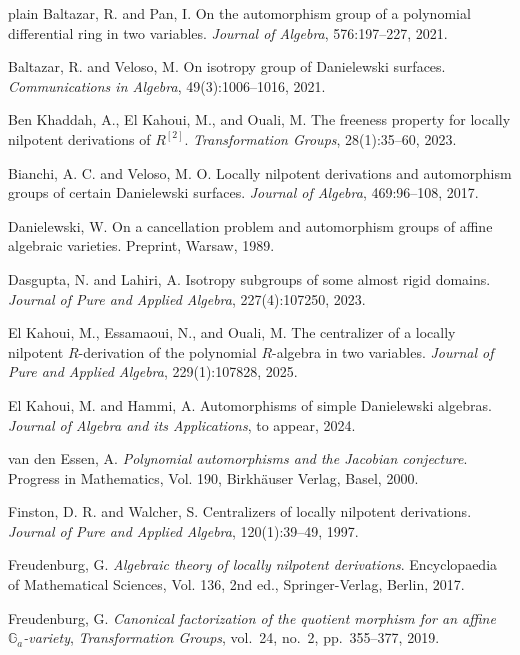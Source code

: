 \documentclass{article}
\begin{document}
{\begin{thebibliography}{plain}
Baltazar, R. and Pan, I. On the automorphism group of a polynomial differential ring in two variables. \textit{Journal of Algebra}, 576:197--227, 2021.

Baltazar, R. and Veloso, M. On isotropy group of Danielewski surfaces. \textit{Communications in Algebra}, 49(3):1006--1016, 2021.

Ben Khaddah, A., El Kahoui, M., and Ouali, M. The freeness property for locally nilpotent derivations of $R^{[2]}$. \textit{Transformation Groups}, 28(1):35--60, 2023.

Bianchi, A. C. and Veloso, M. O. Locally nilpotent derivations and automorphism groups of certain Danielewski surfaces. \textit{Journal of Algebra}, 469:96--108, 2017.

Danielewski, W. On a cancellation problem and automorphism groups of affine algebraic varieties. Preprint, Warsaw, 1989.

Dasgupta, N. and Lahiri, A. Isotropy subgroups of some almost rigid domains. \textit{Journal of Pure and Applied Algebra}, 227(4):107250, 2023.

El Kahoui, M., Essamaoui, N., and Ouali, M. The centralizer of a locally nilpotent $R$-derivation of the polynomial $R$-algebra in two variables. \textit{Journal of Pure and Applied Algebra}, 229(1):107828, 2025.

El Kahoui, M. and Hammi, A. Automorphisms of simple Danielewski algebras. \textit{Journal of Algebra and its Applications}, to appear, 2024.

van den Essen, A. \textit{Polynomial automorphisms and the Jacobian conjecture}. Progress in Mathematics, Vol. 190, Birkhäuser Verlag, Basel, 2000.

Finston, D. R. and Walcher, S. Centralizers of locally nilpotent derivations. \textit{Journal of Pure and Applied Algebra}, 120(1):39--49, 1997.

Freudenburg, G. \textit{Algebraic theory of locally nilpotent derivations}. Encyclopaedia of Mathematical Sciences, Vol. 136, 2nd ed., Springer-Verlag, Berlin, 2017.

Freudenburg, G. \emph{Canonical factorization of the quotient morphism for an affine $\mathbb{G}_a$-variety}, \textit{Transformation Groups}, vol.~24, no.~2, pp.~355--377, 2019.


\end{thebibliography}}
\end{document}
